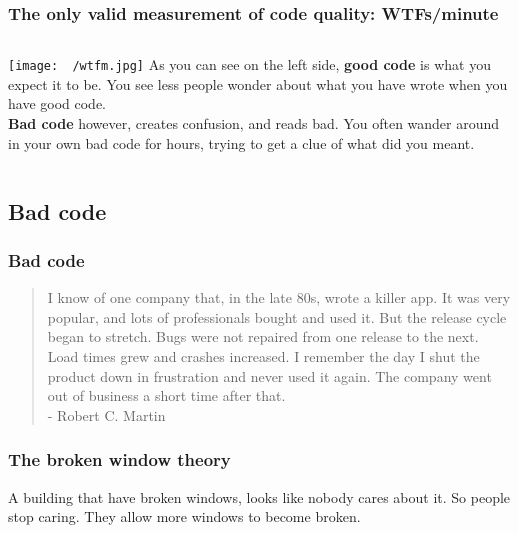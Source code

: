 \documentclass{beamer}
\begin{document}
\begin{frame}
\frametitle{The only valid measurement of code quality: WTFs/minute}
\begin{columns}
  \texttt{[image: ~/wtfm.jpg]}
  As you can see on the left side, \textbf{good code} is what you expect it to be. 
  You see less people wonder about what you have wrote when you have good code.\\
  \textbf{Bad code} however, creates confusion, and reads bad. 
  You often wander around in your own bad code for hours, trying to get a clue of what did you meant.
\end{columns}
\end{frame}

\subsection{Bad code}
\begin{frame}
  \frametitle{Bad code}

  \begin{quote}
  I know of one company that, in the late 80s, wrote a killer app.
  It was very popular, and lots of professionals bought and used it.
  But the release cycle began to stretch.
  Bugs were not repaired from one release to the next.
  Load times grew and crashes increased.
  I remember the day I shut the product down in frustration and never used it again.
  The company went out of business a short time after that. \\

  - Robert C. Martin
  \end{quote}


\note{}
\end{frame}


\begin{frame}
  \frametitle{The broken window theory}
  A building that have broken windows, looks like nobody cares about it.
  So people stop caring. They allow more windows to become broken.


\end{frame}
\end{document}
